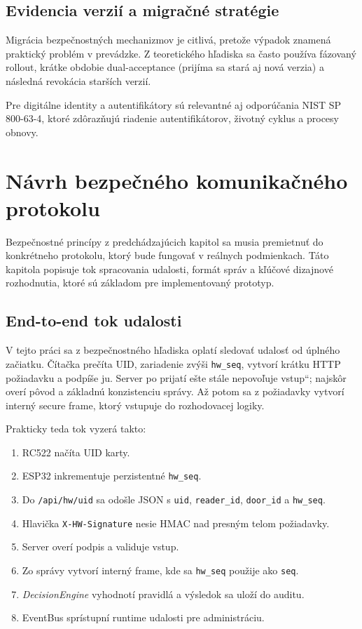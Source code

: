 \documentclass[journal,a4paper,onecolumn]{IEEEtran}
\newcommand{\uv}[1]{\quotedblbase#1\textquotedblleft}
\begin{document}
\subsection{Evidencia verzií a migračné stratégie}

Migrácia bezpečnostných mechanizmov je citlivá, pretože výpadok znamená praktický problém v prevádzke. Z teoretického hľadiska sa často používa fázovaný rollout, krátke obdobie dual-acceptance (prijíma sa stará aj nová verzia) a následná revokácia starších verzií.


Pre digitálne identity a autentifikátory sú relevantné aj odporúčania NIST SP 800-63-4, ktoré zdôrazňujú riadenie autentifikátorov, životný cyklus a procesy obnovy.

\section{Návrh bezpečného komunikačného protokolu}

Bezpečnostné princípy z predchádzajúcich kapitol sa musia premietnuť do konkrétneho protokolu, ktorý bude fungovať v reálnych podmienkach. Táto kapitola popisuje tok spracovania udalosti, formát správ a kľúčové dizajnové rozhodnutia, ktoré sú základom pre implementovaný prototyp.

\subsection{End-to-end tok udalosti}

V tejto práci sa z bezpečnostného hľadiska oplatí sledovať udalosť od úplného začiatku. Čítačka prečíta UID, zariadenie zvýši \texttt{hw\_seq}, vytvorí krátku HTTP požiadavku a podpíše ju. Server po prijatí ešte stále \uv{nepovoľuje vstup}; najskôr overí pôvod a základnú konzistenciu správy. Až potom sa z požiadavky vytvorí interný secure frame, ktorý vstupuje do rozhodovacej logiky.

Prakticky teda tok vyzerá takto:
\begin{enumerate}[leftmargin=*,itemsep=2pt]
  \item RC522 načíta UID karty.
  \item ESP32 inkrementuje perzistentné \texttt{hw\_seq}.
  \item Do \texttt{/api/hw/uid} sa odošle JSON s \texttt{uid}, \texttt{reader\_id}, \texttt{door\_id} a \texttt{hw\_seq}.
  \item Hlavička \texttt{X-HW-Signature} nesie HMAC nad presným telom požiadavky.
  \item Server overí podpis a validuje vstup.
  \item Zo správy vytvorí interný frame, kde sa \texttt{hw\_seq} použije ako \texttt{seq}.
  \item \emph{DecisionEngine} vyhodnotí pravidlá a výsledok sa uloží do auditu.
  \item EventBus sprístupní runtime udalosti pre administráciu.
\end{enumerate}
\end{document}
